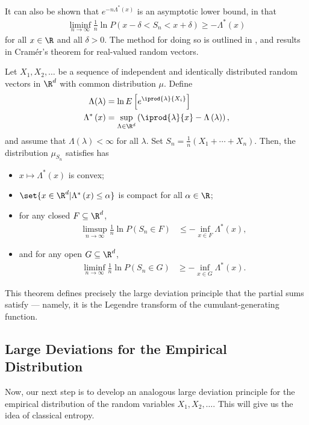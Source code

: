 \documentclass[10pt]{mypackage}
\begin{document}
It can also be shown that $e^{-n\Lambda^{\ast}(x)}$ is an asymptotic lower bound, in that
\begin{align*}
  \liminf_{n\rightarrow\infty} \frac{1}{n}\ln P\left( x-\delta < S_n < x + \delta \right) \geq -\Lambda^{\ast}(x)
\end{align*}
for all $x\in \R$ and all $\delta > 0$. The method for doing so is outlined in \cite[Ch.\,7, Section 2]{mingo_and_speicher}, and results in Cramér's theorem for real-valued random vectors.
\begin{theorem}
  Let $X_1,X_2,\dots$ be a sequence of independent and identically distributed random vectors in $\R^d$ with common distribution $\mu$. Define
  \begin{align*}
    \Lambda(\lambda) &= \ln E\left[ e^{ \iprod{\lambda}{X_i} } \right]\\
    \Lambda^{\ast}\left( x \right) &= \sup_{\Lambda\in \R^d} \left( \iprod{\lambda}{x}-\Lambda\left( \lambda \right) \right),
  \end{align*}
  and assume that $\Lambda\left( \lambda \right) < \infty$ for all $\lambda$. Set $S_n = \frac{1}{n}\left( X_1 + \cdots + X_n \right)$. Then, the distribution $\mu_{S_n}$ satisfies has
  \begin{itemize}
    \item $x\mapsto \Lambda^{\ast}(x)$ is convex;
    \item $\set{x\in \R^d | \Lambda^{\ast}\left( x \right) \leq \alpha}$ is compact for all $\alpha\in \R$;
    \item for any closed $F\subseteq \R^d$,
      \begin{align*}
        \limsup_{n\rightarrow\infty} \frac{1}{n}\ln P\left( S_n\in F \right) &\leq -\inf_{x\in F}\Lambda^{\ast}\left( x \right),
      \end{align*}
    \item and for any open $G\subseteq \R^d$,
      \begin{align*}
        \liminf_{n\rightarrow\infty} \frac{1}{n}\ln P\left( S_n\in G \right) &\geq -\inf_{x\in G}\Lambda^{\ast}\left( x \right).
      \end{align*}
  \end{itemize}
\end{theorem}
This theorem defines precisely the large deviation principle that the partial sums satisfy --- namely, it is the Legendre transform of the cumulant-generating function.
\subsection{Large Deviations for the Empirical Distribution}%
Now, our next step is to develop an analogous large deviation principle for the empirical distribution of the random variables $X_1,X_2,\dots$. This will give us the idea of classical entropy.
\end{document}
